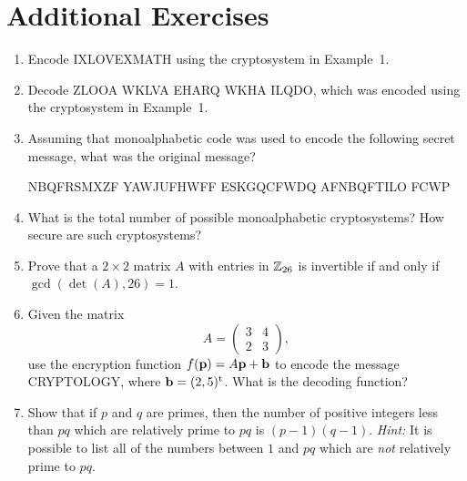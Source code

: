  
 
\section*{Additional Exercises}
\exrule
 
 
{\small 
\begin{enumerate}
 
\bf\item\rm
Encode IXLOVEXMATH using the cryptosystem in Example~1.
 
\bf\item\rm
Decode ZLOOA WKLVA EHARQ WKHA ILQDO, which was encoded using the
cryptosystem in Example~1. 
 
 
\bf\item\rm
Assuming that monoalphabetic code was used to encode the following
secret message, what was the original message?
\begin{center}
NBQFRSMXZF YAWJUFHWFF ESKGQCFWDQ AFNBQFTILO FCWP
\end{center}
 
 
 
\bf\item\rm
What is the total number of possible monoalphabetic cryptosystems? How 
secure are such cryptosystems?
 
 
\bf\item\rm
Prove that a $2 \times 2$ matrix $A$ with entries in ${\Bbb Z}_{26}$
is invertible if and only if $\gcd( \det(A), 26 ) = 1$.
 
 
 
\bf\item\rm
Given the matrix 
$$
A =
\left(
\begin{array}{cc}
3 & 4 \\
2 & 3
\end{array}
\right),
$$
use the encryption function $f({\bold p}) = A {\bold p} + {\bold b}$
to encode the message CRYPTOLOGY, where ${\bold b} = ( 2, 5)^{\rm
t}$.  What is the decoding function?  
 
 
\bf\item\rm
Show that if $p$ and $q$ are primes, then the number of positive integers less than $pq$ which are relatively prime to $pq$ is $(p-1)(q-1)$.  
\emph{Hint:} It is possible to list all of the numbers between $1$ and $pq$ which are \emph{not} relatively prime to $pq$.




\end{enumerate}}
